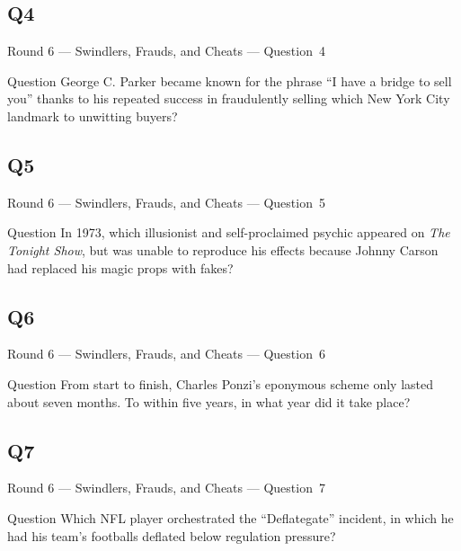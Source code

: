 \documentclass[11pt]{beamer}
\begin{document}
\subsection*{Q4}
\begin{frame}[t]{Round 6 --- Swindlers, Frauds, and Cheats --- \mbox{Question 4}}
\vspace{-0.5em}
\begin{block}{Question}
George C. Parker became known for the phrase ``I have a bridge to sell you'' thanks to his repeated success in fraudulently selling which New York City landmark to unwitting buyers?
\end{block}
\end{frame}
\subsection*{Q5}
\begin{frame}[t]{Round 6 --- Swindlers, Frauds, and Cheats --- \mbox{Question 5}}
\vspace{-0.5em}
\begin{block}{Question}
In 1973, which illusionist and self-proclaimed psychic appeared on \emph{The Tonight Show}, but was unable to reproduce his effects because Johnny Carson had replaced his magic props with fakes?
\end{block}
\end{frame}
\subsection*{Q6}
\begin{frame}[t]{Round 6 --- Swindlers, Frauds, and Cheats --- \mbox{Question 6}}
\vspace{-0.5em}
\begin{block}{Question}
From start to finish, Charles Ponzi's eponymous scheme only lasted about seven months. To within five years, in what year did it take place?
\end{block}
\end{frame}
\subsection*{Q7}
\begin{frame}[t]{Round 6 --- Swindlers, Frauds, and Cheats --- \mbox{Question 7}}
\vspace{-0.5em}
\begin{block}{Question}
Which NFL player orchestrated the ``Deflategate'' incident, in which he had his team's footballs deflated below regulation pressure?
\end{block}
\end{frame}
\end{document}
